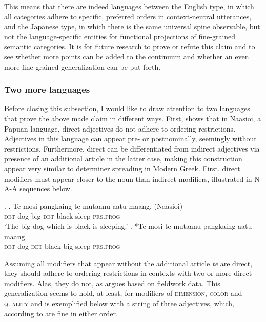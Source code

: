 This means that there are indeed languages between the English type, in which all categories adhere to specific, preferred orders in context-neutral utterances, and the Japanese type, in which there is the same universal spine observable, but not the language-specific entities for functional projections of fine-grained semantic categories. It is for future research to prove or refute this claim and to see whether more points can be added to the continuum and whether an even more fine-grained generalization can be put forth.

\subsubsection{Two more languages} \label{more languages}

Before closing this subsection, I would like to draw attention to two languages that prove the above made claim in different ways. First, \citet{brown:2024:adj} shows that in Naasioi, a Papuan language, direct adjectives do not adhere to ordering restrictions. Adjectives in this language can appear pre- or postnominally, seemingly without restrictions. Furthermore, direct can be differentiated from indirect adjectives via presence of an additional article in the latter case, making this construction appear very similar to determiner spreading in  Modern Greek. First, direct modifiers must appear closer to the noun than indirect modifiers, illustrated in N-A-A sequences below. 

\ex. \ag. Te mosi pangkaing te mutaanu aatu-maang. (Naasioi)\\
\textsc{det} dog big \textsc{det} black sleep-\textsc{prs.prog}\\
`The big dog which is black is sleeping.’
\bg. *Te mosi te mutaanu pangkaing aatu-maang.\\
\textsc{det} dog \textsc{det} black big sleep-\textsc{prs.prog}\\ \null \hfill \citep[432]{brown:2024:adj}

Assuming all modifiers that appear without the additional article \textit{te} are direct, they should adhere to ordering restrictions in contexts with two or more direct modifiers. Alas, they do not, as \citet{brown:2024:adj} argues based on fieldwork data. This generalization seems to hold, at least, for modifiers of \textsc{dimension}, \textsc{color} and \textsc{quality} and is exemplified below with a string of three adjectives, which, according to \citet{brown:2024:adj} are fine in either order.

